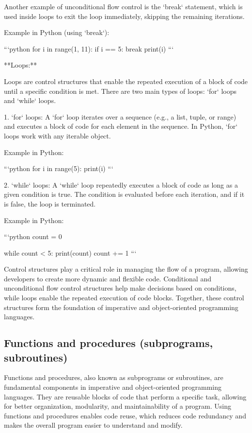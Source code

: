 \documentclass{article}
\begin{document}
Another example of unconditional flow control is the `break` statement, which is used inside loops to exit the loop immediately, skipping the remaining iterations.

Example in Python (using `break`):

```python
for i in range(1, 11):
    if i == 5:
        break
    print(i)
```

**Loops:**

Loops are control structures that enable the repeated execution of a block of code until a specific condition is met. There are two main types of loops: `for` loops and `while` loops.

1. `for` loops: A `for` loop iterates over a sequence (e.g., a list, tuple, or range) and executes a block of code for each element in the sequence. In Python, `for` loops work with any iterable object.

Example in Python:

```python
for i in range(5):
    print(i)
```

2. `while` loops: A `while` loop repeatedly executes a block of code as long as a given condition is true. The condition is evaluated before each iteration, and if it is false, the loop is terminated.

Example in Python:

```python
count = 0

while count < 5:
    print(count)
    count += 1
```

Control structures play a critical role in managing the flow of a program, allowing developers to create more dynamic and flexible code. Conditional and unconditional flow control structures help make decisions based on conditions, while loops enable the repeated execution of code blocks. Together, these control structures form the foundation of imperative and object-oriented programming languages.


\subsection{Functions and procedures (subprograms, subroutines)}

Functions and procedures, also known as subprograms or subroutines, are fundamental components in imperative and object-oriented programming languages. They are reusable blocks of code that perform a specific task, allowing for better organization, modularity, and maintainability of a program. Using functions and procedures enables code reuse, which reduces code redundancy and makes the overall program easier to understand and modify.
\end{document}
